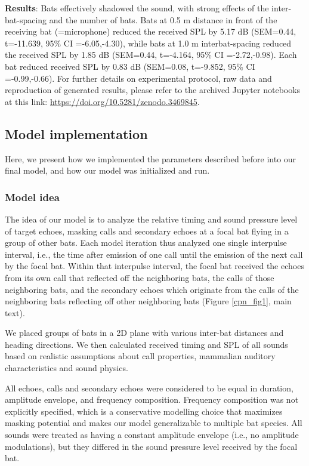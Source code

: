 \documentclass[
]{book}
\begin{document}
\textbf{Results}: Bats effectively shadowed the sound, with strong effects of the inter-bat-spacing and the number of bats. Bats at 0.5 m distance in front of the receiving bat (=microphone) reduced the received SPL by 5.17 dB (SEM=0.44, t=-11.639, 95\% CI =-6.05,-4.30), while bats at 1.0 m interbat-spacing reduced the received SPL by 1.85 dB (SEM=0.44, t=-4.164, 95\% CI =-2.72,-0.98). Each bat reduced received SPL by 0.83 dB (SEM=0.08, t=-9.852, 95\% CI =-0.99,-0.66).
For further details on experimental protocol, raw data and reproduction of
generated results, please refer to the archived Jupyter notebooks at this link:
\url{https://doi.org/10.5281/zenodo.3469845}.

\hypertarget{model-implementation-1}{%
\subsection{Model implementation}\label{model-implementation-1}}

Here, we present how we implemented the parameters described before into our
final model, and how our model was initialized and run.

\hypertarget{model-idea}{%
\subsubsection{Model idea}\label{model-idea}}

The idea of our model is to analyze the relative timing and sound pressure level
of target echoes, masking calls and secondary echoes at a focal bat flying in a
group of other bats. Each model iteration thus analyzed one single interpulse
interval, i.e., the time after emission of one call until the emission of the next call by the focal bat. Within that interpulse interval, the focal bat received the echoes from its own call that reflected off the neighboring bats, the calls of those neighboring bats, and the secondary echoes which originate from the calls of the neighboring bats reflecting off other neighboring bats (Figure \ref{cpn_fig1}, main text).

We placed groups of bats in a 2D plane with various inter-bat distances and
heading directions. We then calculated received timing and SPL of all sounds
based on realistic assumptions about call properties, mammalian auditory
characteristics and sound physics.

All echoes, calls and secondary echoes were considered to be equal in duration,
amplitude envelope, and frequency composition. Frequency composition was not
explicitly specified, which is a conservative modelling choice that maximizes
masking potential \citep{yost2007a} and makes our model generalizable to multiple bat species. All sounds were treated as having a constant amplitude envelope (i.e., no amplitude modulations), but they differed in the sound pressure level received by the focal bat.
\end{document}
